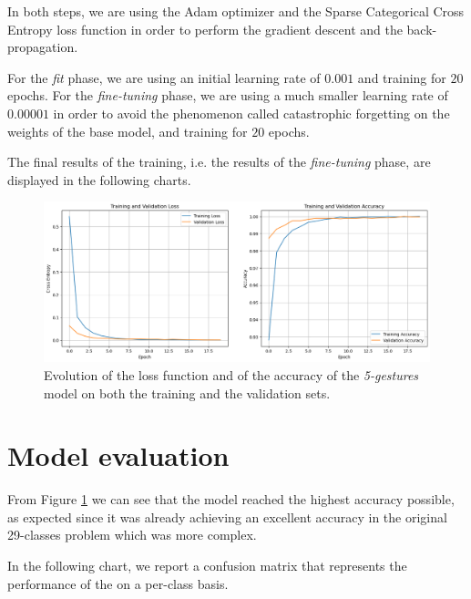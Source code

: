 \documentclass{Configuration_Files/PoliMi3i_thesis}
\begin{document}
In both steps, we are using the Adam optimizer and the Sparse Categorical Cross Entropy loss function in order to perform the gradient descent and the back-propagation. 

For the \textit{fit} phase, we are using an initial learning rate of $0.001$ and training for $20$ epochs. For the \textit{fine-tuning} phase, we are using a much smaller learning rate of $0.00001$ in order to avoid the phenomenon called catastrophic forgetting on the weights of the base model, and training for $20$ epochs.

The final results of the training, i.e. the results of the \textit{fine-tuning} phase, are displayed in the following charts.

\begin{figure}[H]
  \centering
\includegraphics[width=\textwidth]{Figures/5-gestures/5_loss.png}
\caption{Evolution of the loss function and of the accuracy of the \textit{5-gestures} model on both the training and the validation sets.}
\label{fig:5_loss}
\end{figure}


\section{Model evaluation}
\label{sec:5-evaluation}
From Figure \ref{fig:5_loss} we can see that the model reached the highest accuracy possible, as expected since it was already achieving an excellent accuracy in the original 29-classes problem which was more complex.

In the following chart, we report a confusion matrix that represents the performance of the on a per-class basis.
\end{document}
